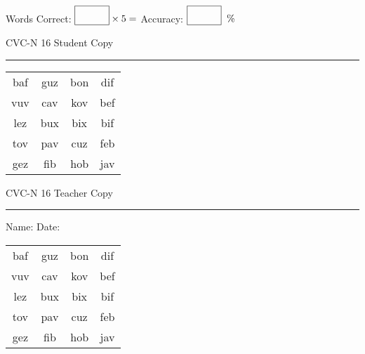\documentclass{memoir}
\begin{document}
\small

Words Correct: $\fbox{\phantom{\huge 100}} \times 5 = $ Accuracy: $\fbox{\phantom{\huge 100}}\;\; \%$ 

\vfill

\newpage


\footnotesize \noindent
CVC-N 16 \hfill Student Copy
\smallskip
\hrule

\Large

\setlength{\tabcolsep}{14pt}
\def\arraystretch{2}

{\selectfont


\begin{vplace}[0.5]
\begin{center}
\begin{tabular}{cccc}
baf & guz & bon & dif \\
vuv & cav & kov & bef \\
lez & bux & bix & bif \\
tov & pav & cuz & feb \\
gez & fib & hob & jav \\
\end{tabular}
\end{center}
\end{vplace}

}

\newpage

\footnotesize \noindent
CVC-N 16 \hfill Teacher Copy
\smallskip
\hrule

\small

\vfill

\noindent
Name: \underline{\hspace{1.75in}} \hfill Date: \underline{\hspace{1in}}

\Large

{\selectfont


\begin{vplace}[0.5]
\begin{center}
\begin{tabular}{cccc}
baf & guz & bon & dif \\
vuv & cav & kov & bef \\
lez & bux & bix & bif \\
tov & pav & cuz & feb \\
gez & fib & hob & jav \\
\end{tabular}
\end{center}
\end{vplace}



}
\end{document}
